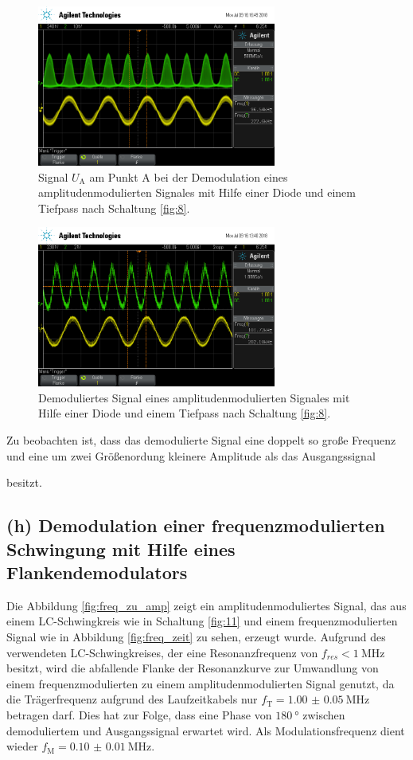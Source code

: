 \begin{figure}
  \centering
  \includegraphics[width=0.7\textwidth]{osci/amp_demod_diode_A.png}
  \caption{Signal $U_{\text{A}}$ am Punkt A bei der Demodulation eines amplitudenmodulierten Signales mit Hilfe einer
  Diode und einem Tiefpass nach Schaltung \ref{fig:8}.}
  \label{fig:diode_punkt_A}
\end{figure}


\begin{figure}
  \centering
  \includegraphics[width=0.7\textwidth]{osci/amp_demod_diode.png}
  \caption{Demoduliertes Signal eines amplitudenmodulierten Signales mit Hilfe einer
  Diode und einem Tiefpass nach Schaltung \ref{fig:8}.}
\label{fig:diode_demod_amp}
\end{figure}

Zu beobachten ist, dass das demodulierte Signal eine doppelt so große Frequenz
und eine um zwei Größenordung kleinere Amplitude als das Ausgangssignal

besitzt.
\FloatBarrier
\subsection{(h) Demodulation einer frequenzmodulierten Schwingung
mit Hilfe eines Flankendemodulators}
\label{subsec:auswertung_h}
Die Abbildung \ref{fig:freq_zu_amp}
zeigt ein amplitudenmoduliertes Signal, das aus einem LC-Schwingkreis
wie in Schaltung \ref{fig:11} und einem frequenzmodulierten Signal wie in Abbildung
\ref{fig:freq_zeit} zu sehen, erzeugt wurde.
Aufgrund des verwendeten LC-Schwingkreises, der eine Resonanzfrequenz von $f_{res}< \SI{1}{\mega\hertz}$ besitzt,
wird die abfallende Flanke der Resonanzkurve zur Umwandlung von einem
frequenzmodulierten zu einem amplitudenmodulierten Signal genutzt,
da die Trägerfrequenz
aufgrund des Laufzeitkabels nur $f_{\text{T}}=\SI{1.00(5)}{\mega\hertz}$ betragen darf.
Dies hat zur Folge, dass eine Phase von $\SI{180}{\degree}$ zwischen demoduliertem und Ausgangssignal
erwartet wird.
Als Modulationsfrequenz dient wieder $f_{\text{M}}=\SI{0.10(1)}{\mega\hertz}$.

